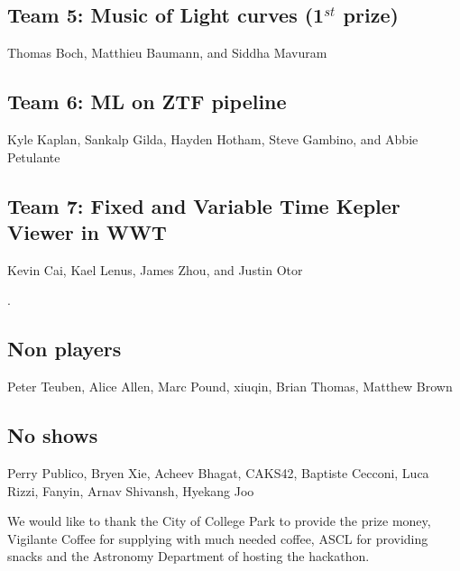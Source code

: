\documentclass[11pt,twoside]{article}
\begin{document}
\subsection*{Team 5: Music of Light curves (1$^{st}$ prize)}

Thomas Boch, Matthieu Baumann, and Siddha Mavuram


\subsection*{Team 6: ML on ZTF pipeline}


Kyle Kaplan, Sankalp Gilda, Hayden Hotham, Steve Gambino, and Abbie Petulante


\subsection*{Team 7: Fixed and Variable Time Kepler Viewer in WWT}

Kevin Cai, Kael Lenus, James Zhou, and Justin Otor


\citep{foo}.

\subsection*{Non players}

Peter Teuben,
Alice Allen,
Marc Pound,
xiuqin,
Brian Thomas,
Matthew Brown

\subsection*{No shows}

Perry Publico,
Bryen Xie,
Acheev Bhagat,
CAKS42,
Baptiste Cecconi,
Luca Rizzi,
Fanyin,
Arnav Shivansh,
Hyekang Joo




\acknowledgements We would like to thank the City of College Park to
provide the prize money, Vigilante Coffee for supplying with much
needed coffee, ASCL for providing snacks and the Astronomy Department
of hosting the hackathon.
\end{document}
